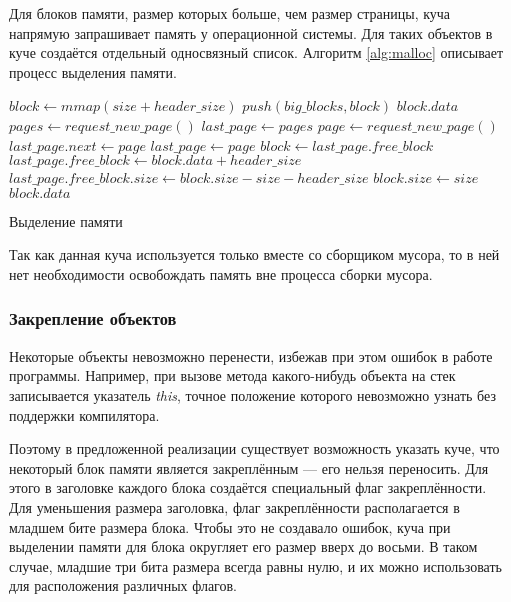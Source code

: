 \documentclass[14pt]{matmex-diploma}
\begin{document}
Для блоков памяти, размер которых больше, чем размер страницы, куча напрямую запрашивает память у операционной системы. Для таких объектов в куче создаётся отдельный односвязный список.
Алгоритм \ref{alg:malloc} описывает процесс выделения памяти. 

\begin{algorithm}[h]
\begin{algorithmic}[1]
    \State $block \gets mmap(size + header\_size)$
    \State $push(big\_blocks, block)$
    \State \Return $block.data$
\EndIf
{}
    \State $pages \gets request\_new\_page()$
    \State $last\_page \gets pages$
\EndIf
{}
    \State $page \gets request\_new\_page()$
    \State $last\_page.next \gets page$
    \State $last\_page \gets page$
\EndIf
\State $block \gets last\_page.free\_block$
\State $last\_page.free\_block \gets block.data + header\_size$
\State $last\_page.free\_block.size \gets block.size - size - header\_size$
\State $block.size \gets size$
\State \Return $block.data$
\end{algorithmic}
\caption{Выделение памяти}\label{alg:malloc}
\end{algorithm}

Так как данная куча используется только вместе со сборщиком мусора, то в ней нет необходимости освобождать память вне процесса сборки мусора.

\subsubsection{Закрепление объектов}
Некоторые объекты невозможно перенести, избежав при этом ошибок в работе программы. Например, при вызове метода какого-нибудь объекта на стек записывается указатель \textit{this}, точное положение которого невозможно узнать без поддержки компилятора.

Поэтому в предложенной реализации существует возможность указать куче, что некоторый блок памяти является закреплённым --- его нельзя переносить.
Для этого в заголовке каждого блока создаётся специальный флаг закреплённости.
Для уменьшения размера заголовка, флаг закреплённости располагается в младшем бите размера блока. Чтобы это не создавало ошибок, куча при выделении памяти для блока округляет его размер вверх до восьми. В таком случае, младшие три бита размера всегда равны нулю, и их можно использовать для расположения различных флагов.
\end{document}
